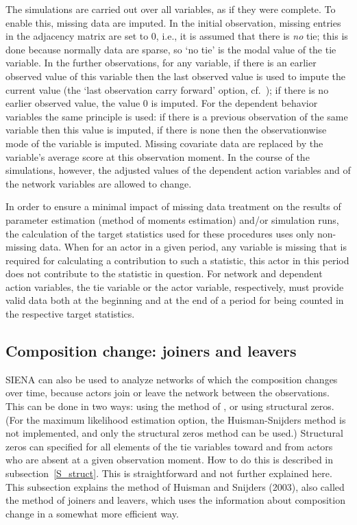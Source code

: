 \documentclass[a4paper,fleqn,11pt]{article}
\newcommand{\+}{\, + \,}
\newcommand{\SI}{{\sf SIENA }}
\begin{document}
{The simulations are carried out over all variables,
as if they were complete.
To enable this, missing data are imputed.
In the initial observation, missing entries in the adjacency
matrix are set to 0,
i.e., it is assumed that there is \emph{no} tie;
this is done because normally data are sparse, so `no tie'
is the modal value of the tie variable.
In the further observations, for any variable,
if there is an earlier observed value of this variable then
the last observed value is used to impute the current
value (the `last observation carry forward' option,
cf.\ \citet{Lepkowski89}); if there is no earlier observed
value, the value 0 is imputed.
For the dependent behavior variables the same principle
is used: if there is a previous observation of the same variable
then this value is imputed, if there is none then the
observationwise mode of the variable is imputed.
Missing covariate data are replaced by the
variable's average score at this observation moment. In the course
of the simulations, however, the adjusted values of the dependent
action variables and of the network variables are allowed to
change.

In order to ensure a minimal impact of missing data treatment on
the results of parameter estimation (method of moments estimation)
and/or simulation runs, the calculation of the target statistics
used for these procedures uses only non-missing data. When
for an actor in a given period, any variable is missing that is
required for calculating a contribution to such a statistic, this
actor in this period does not contribute to the statistic in
question. For network and dependent action variables, the tie variable
or the actor variable, respectively,
must provide valid data both at the beginning and at the end of a
period for being counted in the respective target statistics.

\subsection{Composition change: joiners and leavers}
\label{S_comp}

\SI can also be used to analyze networks of which the composition
changes over time, because actors join or leave the network
between the observations.
This can be done in two ways: using the method of \citet{HuismanSnijders03},
or using structural zeros.
(For the maximum likelihood estimation option, the Huisman-Snijders method
is not implemented, and only the structural zeros method can be used.)
Structural zeros can specified for all elements of the tie variables
toward and from actors who are absent at a given observation moment.
How to do this is described in subsection~\ref{S_struct}.
This is straightforward and not further explained here.
This subsection explains the method of Huisman and Snijders
(2003), also called the method of joiners and leavers,
which uses the information about composition change
in a somewhat more efficient way.

}
\end{document}
